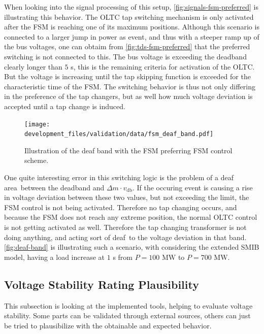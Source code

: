When looking into the signal processing of this setup, \autoref{fig:signals-fsm-preferred} is illustrating this behavior.
The \acs{OLTC} tap switching mechanism is only activated after the \acs{FSM} is reaching one of its maximum positions.
Although this scenario is connected to a larger jump in power as event, and thus with a steeper ramp up of the bus voltages, one can obtaim from \autoref{fig:tds-fsm-preferred} that the preferred switching is not connected to this.
The bus voltage is exceeding the deadband clearly longer than $5$ s, this is the remaining criteria for activation of the \acs{OLTC}.
But the voltage is increasing until the tap skipping function is exceeded for the characteristic time of the \acs{FSM}.
The switching behavior is thus not only differing in the preference of the tap changers, but as well how much voltage deviation is accepted until a tap change is induced. 

\begin{figure}[htbp!]
    \centering
    \texttt{[image: development\_files/validation/data/fsm\_deaf\_band.pdf]}
    \caption[Illustration of the \glqq deaf band\grqq~with the FSM preferring FSM control scheme]{Illustration of the deaf band with the FSM preferring FSM control scheme.}
    \label{fig:deaf-band}
\end{figure}

One quite interesting error in this switching logic is the problem of a \glqq deaf area\grqq~between the deadband and $\Delta m \cdot v_\mathrm{db}$.
If the occuring event is causing a rise in voltage deviation between these two values, but not exceeding the limit, the \acs{FSM} control is not being activated.
Therefore no tap changing occurs, and because the \acs{FSM} does not reach any extreme position, the normal \acs{OLTC} control is not getting activated as well.
Therefore the tap changing transformer is not doing anything, and acting sort of \glqq deaf\grqq~to the voltage deviation in that band.
\autoref{fig:deaf-band} is illustrating such a scenario, with considering the extended \acs{SMIB} model, having a load increase at $1$ s from $P=100\text{ MW}$ to $P=700\text{ MW}$.

\subsection{Voltage Stability Rating Plausibility}

This subsection is looking at the implemented tools, helping to evaluate voltage stability.
Some parts can be validated through external sources, others can just be tried to plausibilize with the obtainable and expected behavior. 

